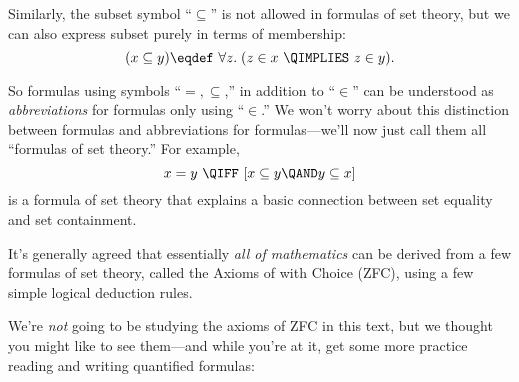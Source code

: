 Similarly, the subset symbol ``$\subseteq$'' is not allowed in
formulas of set theory, but we can also express subset purely in terms
of membership:
\begin{equation}\label{xsubeqy}
(x \subseteq y) \eqdef\ \forall z.\; (z \in x\ \QIMPLIES\ z \in y).
\end{equation}

So formulas using symbols ``$=,\subseteq$,'' in addition to ``$\in$''
can be understood as \emph{abbreviations} for formulas only using
``$\in$.''  We won't worry about this distinction between formulas and
abbreviations for formulas---we'll now just call them all ``formulas of
set theory.''  For example,
\[
x= y\ \QIFF\ [x \subseteq y \QAND y \subseteq x]
\]
is a formula of set theory that explains a basic connection between
set equality and set containment.

It's generally agreed that essentially \emph{all of mathematics} can
be derived from a few formulas of set theory, called the Axioms of
 with Choice (ZFC), using a few
simple logical deduction rules.


We're \emph{not} going to be studying the axioms of ZFC in this text,
but we thought you might like to see them---and while you're at it,
get some more practice reading and writing quantified formulas:

